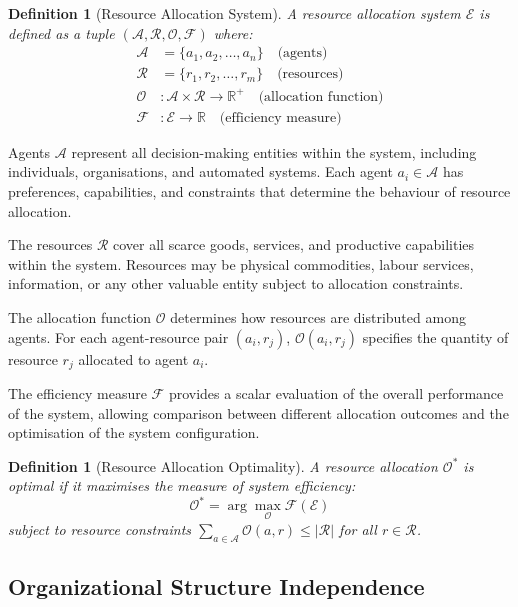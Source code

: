 \documentclass[12pt,a4paper]{article}
\newtheorem{definition}[theorem]{Definition}
\begin{document}
\begin{definition}[Resource Allocation System]
A resource allocation system $\mathcal{E}$ is defined as a tuple $(\mathcal{A}, \mathcal{R}, \mathcal{O}, \mathcal{F})$ where:
\begin{align}
\mathcal{A} &= \{a_1, a_2, \ldots, a_n\} \quad \text{(agents)} \\
\mathcal{R} &= \{r_1, r_2, \ldots, r_m\} \quad \text{(resources)} \\
\mathcal{O} &: \mathcal{A} \times \mathcal{R} \to \mathbb{R}^+ \quad \text{(allocation function)} \\
\mathcal{F} &: \mathcal{E} \to \mathbb{R} \quad \text{(efficiency measure)}
\end{align}
\end{definition}

Agents $\mathcal{A}$ represent all decision-making entities within the system, including individuals, organisations, and automated systems. Each agent $a_i \in \mathcal{A}$ has preferences, capabilities, and constraints that determine the behaviour of resource allocation.

The resources $\mathcal{R}$ cover all scarce goods, services, and productive capabilities within the system. Resources may be physical commodities, labour services, information, or any other valuable entity subject to allocation constraints.

The allocation function $\mathcal{O}$ determines how resources are distributed among agents. For each agent-resource pair $(a_i, r_j)$, $\mathcal{O}(a_i, r_j)$ specifies the quantity of resource $r_j$ allocated to agent $a_i$.

The efficiency measure $\mathcal{F}$ provides a scalar evaluation of the overall performance of the system, allowing comparison between different allocation outcomes and the optimisation of the system configuration.

\begin{definition}[Resource Allocation Optimality]
A resource allocation $\mathcal{O}^*$ is optimal if it maximises the measure of system efficiency: 
\begin{equation}
\mathcal{O}^* = \arg\max_{\mathcal{O}} \mathcal{F}(\mathcal{E})
\end{equation}
subject to resource constraints $\sum_{a \in \mathcal{A}} \mathcal{O}(a,r) \leq |\mathcal{R}|$ for all $r \in \mathcal{R}$.
\end{definition}

\subsection{Organizational Structure Independence}
\end{document}
